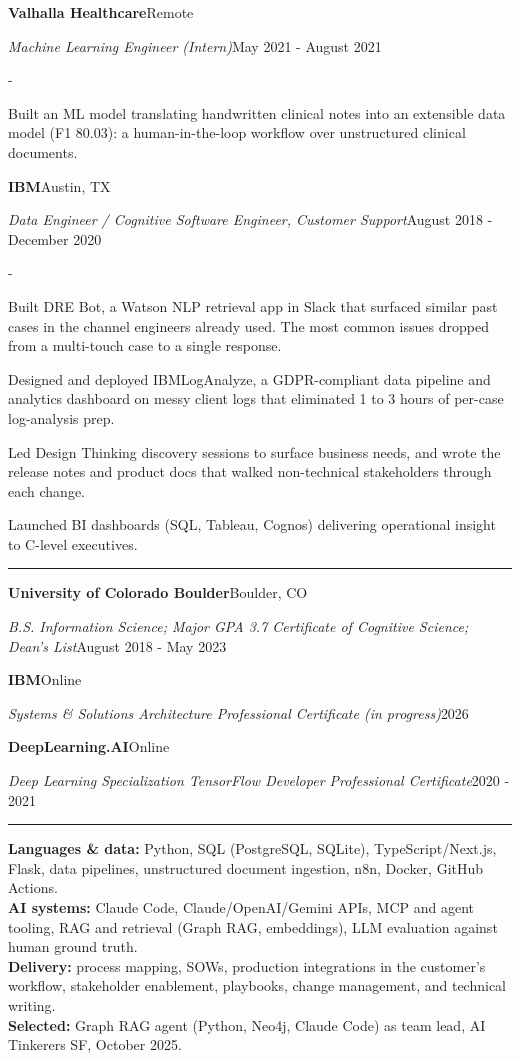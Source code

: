 \documentclass[10pt,letterpaper]{article}
\newenvironment{cvitems}{%
  \begin{list}{-}{%
    \setlength{\leftmargin}{12pt}%
    \setlength{\itemsep}{1.2pt}%
    \setlength{\parsep}{0pt}%
    \setlength{\topsep}{1.5pt}%
    \setlength{\partopsep}{0pt}%
    \setlength{\labelwidth}{6pt}%
    \setlength{\labelsep}{6pt}%
    \setlength{\itemindent}{0pt}%
  }%
}{\end{list}}
\newcommand{\cvsection}[1]{%
  \vspace{7pt}%
  \noindent{\bfseries\fontsize{11pt}{13pt}\selectfont\MakeUppercase{#1}}\par
  \vspace{1pt}%
  \noindent\rule{\textwidth}{0.4pt}\par
  \vspace{4pt}%
}
\newcommand{\cventryhead}[4]{%
  \noindent\textbf{#1}\hfill#2\par
  \vspace{0.5pt}%
  \noindent\textit{#3}\hfill#4\par
}
\newcommand{\cveduhead}[4]{%
  \noindent\textbf{#1}\hfill#2\par
  \vspace{0.5pt}%
  \noindent\textit{#3}\hfill#4\par
}
\begin{document}
\vspace{3pt}
\cventryhead{Valhalla Healthcare}{Remote}
{Machine Learning Engineer (Intern)}{May 2021 - August 2021}
\begin{cvitems}
  \item Built an ML model translating handwritten clinical notes into an extensible data model (F1 80.03): a human-in-the-loop workflow over unstructured clinical documents.
\end{cvitems}

\vspace{3pt}
\cventryhead{IBM}{Austin, TX}
{Data Engineer / Cognitive Software Engineer, Customer Support}{August 2018 - December 2020}
\begin{cvitems}
  \item Built DRE Bot, a Watson NLP retrieval app in Slack that surfaced similar past cases in the channel engineers already used. The most common issues dropped from a multi-touch case to a single response.
  \item Designed and deployed IBMLogAnalyze, a GDPR-compliant data pipeline and analytics dashboard on messy client logs that eliminated 1 to 3 hours of per-case log-analysis prep.
  \item Led Design Thinking discovery sessions to surface business needs, and wrote the release notes and product docs that walked non-technical stakeholders through each change.
  \item Launched BI dashboards (SQL, Tableau, Cognos) delivering operational insight to C-level executives.
\end{cvitems}

\cvsection{Education}

\cveduhead{University of Colorado Boulder}{Boulder, CO}
{B.S. Information Science; Major GPA 3.7 \textbar{} Certificate of Cognitive Science; Dean's List}{August 2018 - May 2023}

\vspace{3pt}
\cveduhead{IBM}{Online}
{Systems \& Solutions Architecture Professional Certificate (in progress)}{2026}

\vspace{3pt}
\cveduhead{DeepLearning.AI}{Online}
{Deep Learning Specialization \textbar{} TensorFlow Developer Professional Certificate}{2020 - 2021}

\cvsection{Skills}

{\raggedright
\noindent\textbf{Languages \& data:} Python, SQL (PostgreSQL, SQLite), TypeScript/Next.js, Flask, data pipelines, unstructured document ingestion, n8n, Docker, GitHub Actions.\\[2pt]
\noindent\textbf{AI systems:} Claude Code, Claude/OpenAI/Gemini APIs, MCP and agent tooling, RAG and retrieval (Graph RAG, embeddings), LLM evaluation against human ground truth.\\[2pt]
\noindent\textbf{Delivery:} process mapping, SOWs, production integrations in the customer's workflow, stakeholder enablement, playbooks, change management, and technical writing.\\[2pt]
\noindent\textbf{Selected:} Graph RAG agent (Python, Neo4j, Claude Code) as team lead, AI Tinkerers SF, October 2025.\par
}
\end{document}
